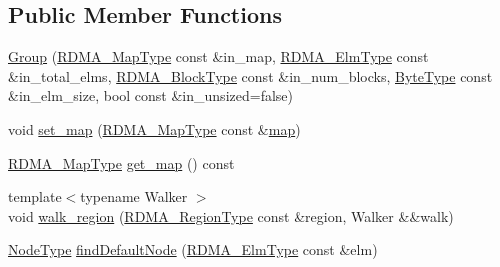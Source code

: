\subsection*{Public Member Functions}
\begin{DoxyCompactItemize}
\item 
\hyperlink{structvt_1_1rdma_1_1_group_a2e4d5e75abc385ed0769de042b070d66}{Group} (\hyperlink{structvt_1_1rdma_1_1_group_a6a953be1b6d9907d49364a9a202d3379}{R\+D\+M\+A\+\_\+\+Map\+Type} const \&in\+\_\+map, \hyperlink{namespacevt_a2c2a902092b72056f70210c159f966f0}{R\+D\+M\+A\+\_\+\+Elm\+Type} const \&in\+\_\+total\+\_\+elms, \hyperlink{namespacevt_ae54d2ca8f6bb4d65faf65118c82cd6f7}{R\+D\+M\+A\+\_\+\+Block\+Type} const \&in\+\_\+num\+\_\+blocks, \hyperlink{namespacevt_aab8d55968084610ce3b17057981e9300}{Byte\+Type} const \&in\+\_\+elm\+\_\+size, bool const \&in\+\_\+unsized=false)
\item 
void \hyperlink{structvt_1_1rdma_1_1_group_a726d4eafcea7fa313ceabbb6938550a1}{set\+\_\+map} (\hyperlink{structvt_1_1rdma_1_1_group_a6a953be1b6d9907d49364a9a202d3379}{R\+D\+M\+A\+\_\+\+Map\+Type} const \&\hyperlink{structvt_1_1rdma_1_1_group_ab2d2df3f8a32c3230210ab7ce74c0e4e}{map})
\item 
\hyperlink{structvt_1_1rdma_1_1_group_a6a953be1b6d9907d49364a9a202d3379}{R\+D\+M\+A\+\_\+\+Map\+Type} \hyperlink{structvt_1_1rdma_1_1_group_a73a2d27f3ff477eb761d45c8b1bd6445}{get\+\_\+map} () const
\item 
{\footnotesize template$<$typename Walker $>$ }\\void \hyperlink{structvt_1_1rdma_1_1_group_a53c1941f50d8c724ea56c824cd514eee}{walk\+\_\+region} (\hyperlink{structvt_1_1rdma_1_1_group_a245644a7a0c40c547728a74e69c5e02f}{R\+D\+M\+A\+\_\+\+Region\+Type} const \&region, Walker \&\&walk)
\item 
\hyperlink{namespacevt_a866da9d0efc19c0a1ce79e9e492f47e2}{Node\+Type} \hyperlink{structvt_1_1rdma_1_1_group_aae5cb279219369b78d1c2f6d6b96fb56}{find\+Default\+Node} (\hyperlink{namespacevt_a2c2a902092b72056f70210c159f966f0}{R\+D\+M\+A\+\_\+\+Elm\+Type} const \&elm)
\end{DoxyCompactItemize}
